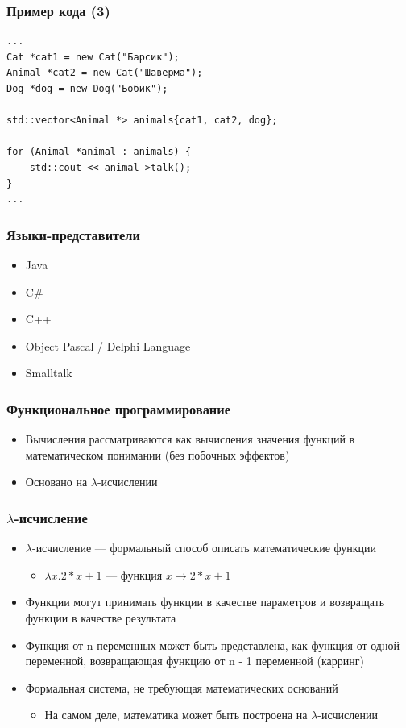 \documentclass[xetex,mathserif,serif]{beamer}
\begin{document}
	\begin{frame}[fragile]
		\frametitle{Пример кода (3)}
		\begin{verbatim}
...
Cat *cat1 = new Cat("Барсик");
Animal *cat2 = new Cat("Шаверма");
Dog *dog = new Dog("Бобик");

std::vector<Animal *> animals{cat1, cat2, dog};

for (Animal *animal : animals) {
    std::cout << animal->talk();
}
...
		\end{verbatim}
	\end{frame}

	\begin{frame}
		\frametitle{Языки-представители}
		\begin{itemize}
			\item Java
			\item C\#
			\item C++
			\item Object Pascal / Delphi Language
			\item Smalltalk
		\end{itemize}
	\end{frame}

	\begin{frame}
		\frametitle{Функциональное программирование}
		\begin{itemize}
			\item Вычисления рассматриваются как вычисления значения функций в математическом понимании (без побочных эффектов)
			\item Основано на $\lambda$-исчислении
		\end{itemize}
	\end{frame}

	\begin{frame}
		\frametitle{$\lambda$-исчисление}
		\begin{itemize}
			\item $\lambda$-исчисление --- формальный способ описать математические функции
			\begin{itemize}
				\item $\lambda{x}.2 * x + 1$ --- функция $x \rightarrow 2 * x + 1$
			\end{itemize}
			\item Функции могут принимать функции в качестве параметров и возвращать функции в качестве результата
			\item Функция от n переменных может быть представлена, как функция от одной переменной, возвращающая функцию от n - 1 переменной (карринг)
			\item Формальная система, не требующая математических оснований
			\begin{itemize}
				\item На самом деле, математика может быть построена на $\lambda$-исчислении
			\end{itemize}
		\end{itemize}
	\end{frame}
\end{document}
